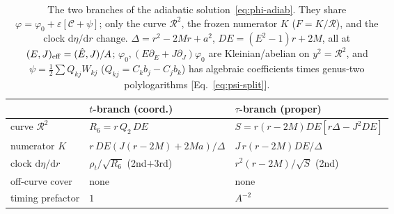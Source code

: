 \documentclass[
    aps, prd, twocolumn, superscriptaddress,
    showpacs, nofootinbib, floatfix
]{revtex4-2}
\newcommand{\Ehat}{\hat E}
\newcommand{\dd}{\mathrm{d}}
\begin{document}
\begin{table}[t]
    \centering
    \caption{The two branches of the adiabatic solution~\eqref{eq:phi-adiab}. They
    share $\varphi=\varphi_0+\varepsilon[\mathcal{C}+\psi]$;
    only the curve $\mathcal{R}^2$, the frozen numerator $K$ ($F=K/\mathcal{R}$),
    and the clock $\dd\eta/\dd r$ change. $\Delta=r^2-2Mr+a^2$, $DE=(E^2-1)r+2M$,
    all at $(E,J)_{\rm eff}=(\Ehat,J)/A$; $\varphi_0,(E\partial_E+J\partial_J)\varphi_0$
    are Kleinian/abelian on $y^2=\mathcal{R}^2$, and
    $\psi=\tfrac12\sum Q_{kj}W_{kj}$ ($Q_{kj}=C_kb_j-C_jb_k$) has algebraic
    coefficients times genus-two polylogarithms [Eq.~\eqref{eq:psi-split}].}
    \label{tab:branch-adiab}
    \begin{ruledtabular}
    \begin{tabular}{lll}
         & $t$-branch (coord.) & $\tau$-branch (proper)\\
        \hline
        curve $\mathcal{R}^2$ & $R_6=r\,Q_2\,DE$ & $S=r(r{-}2M)DE[r\Delta{-}J^2DE]$\\
        numerator $K$ & $r\,DE(J(r{-}2M){+}2Ma)/\Delta$ & $J\,r(r{-}2M)DE/\Delta$\\
        clock $\dd\eta/\dd r$ & $\rho_t/\sqrt{R_6}$ (2nd$+$3rd)
            & $r^2(r-2M)/\sqrt{S}$ (2nd)\\
        off-curve cover & none & none\\
        timing prefactor & $1$ & $A^{-2}$\\
    \end{tabular}
    \end{ruledtabular}
\end{table}
\end{document}
